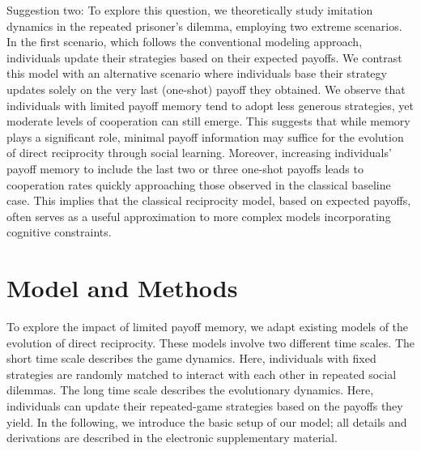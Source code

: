 \documentclass[11pt]{article}
\def\esm{electronic supplementary material}
\theoremstyle{plainCl1}
\theoremstyle{plainCl2}
\begin{document}
Suggestion two:
To explore this question, we theoretically study imitation dynamics in the
repeated prisoner's dilemma, employing two extreme scenarios. In the first
scenario, which follows the conventional modeling approach, individuals update
their strategies based on their expected payoffs. We contrast this model with an
alternative scenario where individuals base their strategy updates solely on the
very last (one-shot) payoff they obtained. We observe that individuals with
limited payoff memory tend to adopt less generous strategies, yet moderate
levels of cooperation can still emerge. This suggests that while memory plays a
significant role, minimal payoff information may suffice for the evolution of
direct reciprocity through social learning. Moreover, increasing individuals'
payoff memory to include the last two or three one-shot payoffs leads to
cooperation rates quickly approaching those observed in the classical baseline
case. This implies that the classical reciprocity model, based on expected
payoffs, often serves as a useful approximation to more complex models
incorporating cognitive constraints.



\section{Model and Methods}\label{section:model}


To explore the impact of limited payoff memory, we adapt existing models of the evolution of direct reciprocity.
These models involve two different time scales. 
The short time scale describes the game dynamics. 
Here, individuals with fixed strategies are randomly matched to interact with each other in repeated social dilemmas. 
The long time scale describes the evolutionary dynamics. 
Here, individuals can update their repeated-game strategies based on the payoffs they yield. 
In the following, we introduce the basic setup of our model; all details and derivations are described in the \esm.\\

\end{document}
